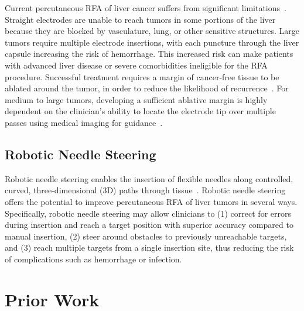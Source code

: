 Current percutaneous RFA of liver cancer suffers from significant limitations~\cite{Gervais2009}. Straight electrodes are unable to reach tumors in some portions of the liver because they are blocked by vasculature, lung, or other sensitive structures. Large tumors require multiple electrode insertions, with each puncture through the liver capsule increasing the risk of hemorrhage. This increased risk can make patients with advanced liver disease or severe comorbidities ineligible for the RFA procedure. Successful treatment requires a margin of cancer-free tissue to be ablated around the tumor, in order to reduce the likelihood of recurrence~\cite{Kim2006}. For medium to large tumors, developing a sufficient ablative margin is highly dependent on the clinician's ability to locate the electrode tip over multiple passes using medical imaging for guidance~\cite{Dodd2001}. 

\subsection{Robotic Needle Steering}
Robotic needle steering enables the insertion of flexible needles along controlled, curved, three-dimensional (3D) paths through tissue~\cite{DiMaio2005,Webster2006}. Robotic needle steering offers the potential to improve percutaneous RFA of liver tumors in several ways. Specifically, robotic needle steering may allow clinicians to (1) correct for errors during insertion and reach a target position with superior accuracy compared to manual insertion, (2) steer around obstacles to previously unreachable targets, and (3) reach multiple targets from a single insertion site, thus reducing the risk of complications such as hemorrhage or infection.

\section{Prior Work}

